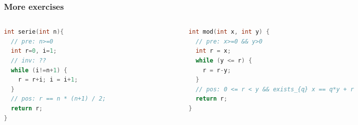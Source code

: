 \documentclass[aspectratio=169]{beamer}
\begin{document}
\begin{frame}[fragile]\frametitle{More exercises}

\begin{columns}
\begin{column}{0.48\textwidth}
\begin{lstlisting}[language=C++]
int serie(int n){
  // pre: n>=0
  int r=0, i=1;
  // inv: ??
  while (i!=n+1) {
    r = r+i; i = i+1;
  }
  // pos: r == n * (n+1) / 2;
  return r;
}
\end{lstlisting}
\end{column}
\begin{column}{0.48\textwidth}
\begin{lstlisting}[language=C++]
int mod(int x, int y) {
  // pre: x>=0 && y>0
  int r = x;
  while (y <= r) {
    r = r-y;
  }
  // pos: 0 <= r < y && exists_{q} x == q*y + r
  return r;
}
\end{lstlisting}
\end{column}
\end{columns}

\end{frame}
\end{document}
